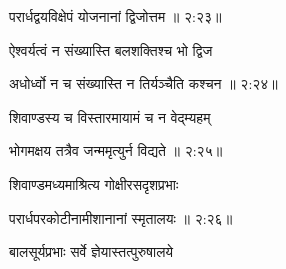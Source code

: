 
{\devanagarifont परार्धद्वयविक्षेपं योजनानां द्विजोत्तम {॥ २:२३॥} \veg\dontdisplaylinenum }%

{\devanagarifont ऐश्वर्यत्वं न संख्यास्ति बलशक्तिश्च भो द्विज \thinspace{\dandab} \dontdisplaylinenum }%


{\devanagarifont अधोर्ध्वो न च संख्यास्ति न तिर्यञ्चैति कश्चन {॥ २:२४॥} \veg\dontdisplaylinenum }%
     \var{{\devanagarifont \numnoemph\vc \lem \mssALL, \om\ \msNaacorr}}%

{\devanagarifont शिवाण्डस्य च विस्तारमायामं च न वेद्म्यहम् \thinspace{\dandab} \dontdisplaylinenum }%
 

{\devanagarifont भोगमक्षय तत्रैव जन्ममृत्युर्न विद्यते {॥ २:२५॥} \veg\dontdisplaylinenum }%

{\devanagarifont शिवाण्डमध्यमाश्रित्य गोक्षीरसदृशप्रभाः \thinspace{\dandab} \dontdisplaylinenum }%


{\devanagarifont परार्धपरकोटीनामीशानानां स्मृतालयः {॥ २:२६॥} \veg\dontdisplaylinenum }%

\vfill
\pageparbreak
\vers

{\devanagarifont बालसूर्यप्रभाः सर्वे ज्ञेयास्तत्पुरुषालये \thinspace{\dandab} \dontdisplaylinenum }%

